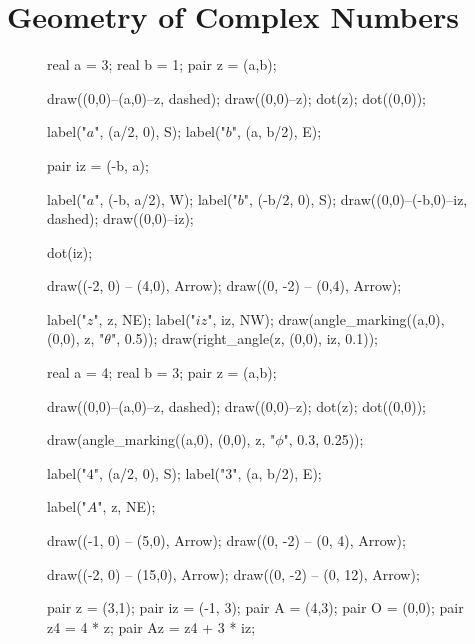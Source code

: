 \documentclass[../gatm.tex]{subfiles}
\begin{document}

\section{Geometry of Complex Numbers}

\begin{figure}[h]
	\begin{minipage}[b]{0.3\textwidth}
		\begin{asy}[width=\textwidth]
		real a = 3;
		real b = 1;
		pair z = (a,b);
		
		draw((0,0)--(a,0)--z, dashed);
		draw((0,0)--z);
		dot(z);
		dot((0,0));
		
		label("$a$", (a/2, 0), S);
		label("$b$", (a, b/2), E);
		
		pair iz = (-b, a);
		
		label("$a$", (-b, a/2), W);
		label("$b$", (-b/2, 0), S);
		draw((0,0)--(-b,0)--iz, dashed);
		draw((0,0)--iz);
		
		dot(iz);
		
		draw((-2, 0) -- (4,0), Arrow);
		draw((0, -2) -- (0,4), Arrow);
		
		label("$z$", z, NE);
		label("$iz$", iz, NW);
		draw(angle_marking((a,0), (0,0), z, "$\theta$", 0.5));
		draw(right_angle(z, (0,0), iz, 0.1));
		\end{asy}
	\end{minipage}\hfill
	\begin{minipage}[b]{0.3\textwidth}
		\begin{asy}[width=\textwidth]
		real a = 4;
		real b = 3;
		pair z = (a,b);
		
		draw((0,0)--(a,0)--z, dashed);
		draw((0,0)--z);
		dot(z);
		dot((0,0));
		
		draw(angle_marking((a,0), (0,0), z, "$\phi$", 0.3, 0.25));
		
		label("$4$", (a/2, 0), S);
		label("$3$", (a, b/2), E);
		
		label("$A$", z, NE);
		
		draw((-1, 0) -- (5,0), Arrow);
		draw((0, -2) -- (0, 4), Arrow);
		\end{asy}
	\end{minipage}
	\begin{minipage}[b]{0.3\textwidth}
		\begin{asy}[width=\textwidth]
		draw((-2, 0) -- (15,0), Arrow);
		draw((0, -2) -- (0, 12), Arrow);
		
		pair z = (3,1);
		pair iz = (-1, 3);
		pair A = (4,3);
		pair O = (0,0);
		pair z4 = 4 * z;
		pair Az = z4 + 3 * iz;
		

\end{asy}
\end{minipage}
\end{figure}
\end{document}
